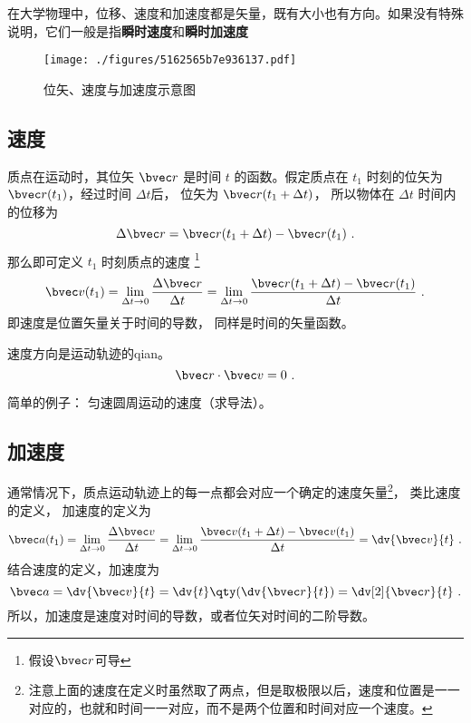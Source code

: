 

在大学物理中，位移、速度和加速度都是矢量，既有大小也有方向。如果没有特殊说明，它们一般是指\textbf{瞬时速度}和\textbf{瞬时加速度}

\begin{figure}[ht]
\centering
\texttt{[image: ./figures/5162565b7e936137.pdf]}
\caption{位矢、速度与加速度示意图} \label{fig_VnA_1}
\end{figure}

\subsection{速度}

质点在运动时，其位矢 $\bvec r$ 是时间 $t$ 的函数。假定质点在 $t_1$ 时刻的位矢为 $\bvec r(t_1)$，经过时间 $\Delta t$后， 位矢为 $\bvec r(t_1 + \Delta t)$， 所以物体在 $\Delta t$ 时间内的位移为
\begin{equation}
\Delta \bvec r = \bvec r (t_1 + \Delta t) - \bvec r (t_1)~.
\end{equation}
那么即可定义 $t_1$ 时刻质点的速度
\footnote{假设$\bvec r$可导}
\begin{equation}
\bvec v(t_1) = \lim_{\Delta t \to 0} \frac{\Delta \bvec r}{\Delta t} = \lim_{\Delta t \to 0} \frac{\bvec r (t_1 + \Delta t) - \bvec r(t_1)}{\Delta t}~.
\end{equation}
即速度是位置矢量关于时间的导数， 同样是时间的矢量函数。

\begin{theorem}{}
速度方向是运动轨迹的qian。
\begin{equation}
\bvec r \cdot \bvec v = 0~.
\end{equation}
\end{theorem}

简单的例子： 匀速圆周运动的速度（求导法）。

\subsection{加速度}

通常情况下，质点运动轨迹上的每一点都会对应一个确定的速度矢量\footnote{注意上面的速度在定义时虽然取了两点，但是取极限以后，速度和位置是一一对应的，也就和时间一一对应，而不是两个位置和时间对应一个速度。}， 类比速度的定义， 加速度的定义为
\begin{equation}\label{eq_VnA_4}
\bvec a(t_1) = \lim_{\Delta t \to 0} \frac{\Delta \bvec v}{\Delta t}
= \lim_{\Delta t \to 0} \frac{\bvec v(t_1 + \Delta t) - \bvec v (t_1)}{\Delta t} = \dv{\bvec v}{t}~.
\end{equation}
结合速度的定义，加速度为
\begin{equation}
\bvec a = \dv{\bvec v}{t} = \dv{t} \qty( \dv{\bvec r}{t} ) = \dv[2]{\bvec r}{t}~.
\end{equation}
所以，加速度是速度对时间的导数，或者位矢对时间的二阶导数。

